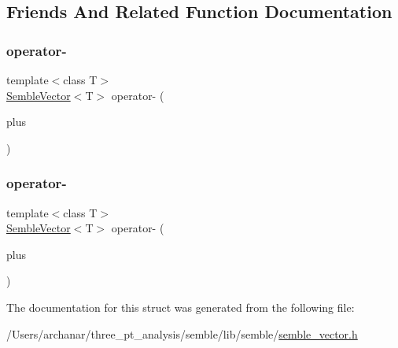 \subsection{Friends And Related Function Documentation}
\mbox{\label{structSEMBLE_1_1SembleVector_a204fd16972939dadf04093410ae09bef}} 
\subsubsection{\texorpdfstring{operator-\/}{operator-}\hspace{0.1cm}{\footnotesize\ttfamily [1/2]}}
{\footnotesize\ttfamily template$<$class T$>$ \\
\mbox{\hyperlink{structSEMBLE_1_1SembleVector}{Semble\+Vector}}$<$T$>$ operator-\/ (\begin{DoxyParamCaption}\item[{const \mbox{\hyperlink{structSEMBLE_1_1SembleVector}{Semble\+Vector}}$<$ T $>$ \&}]{plus }\end{DoxyParamCaption})\hspace{0.3cm}{\ttfamily [friend]}}

\mbox{\label{structSEMBLE_1_1SembleVector_a204fd16972939dadf04093410ae09bef}} 
\subsubsection{\texorpdfstring{operator-\/}{operator-}\hspace{0.1cm}{\footnotesize\ttfamily [2/2]}}
{\footnotesize\ttfamily template$<$class T$>$ \\
\mbox{\hyperlink{structSEMBLE_1_1SembleVector}{Semble\+Vector}}$<$T$>$ operator-\/ (\begin{DoxyParamCaption}\item[{const \mbox{\hyperlink{structSEMBLE_1_1SembleVector}{Semble\+Vector}}$<$ T $>$ \&}]{plus }\end{DoxyParamCaption})\hspace{0.3cm}{\ttfamily [friend]}}



The documentation for this struct was generated from the following file\+:\begin{DoxyCompactItemize}
\item 
/\+Users/archanar/three\+\_\+pt\+\_\+analysis/semble/lib/semble/\mbox{\hyperlink{lib_2semble_2semble__vector_8h}{semble\+\_\+vector.\+h}}\end{DoxyCompactItemize}
